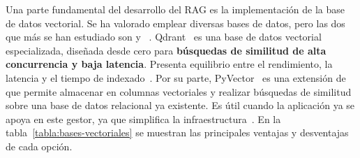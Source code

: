 Una parte fundamental del desarrollo del RAG es la implementación de la base de datos vectorial. Se ha valorado emplear diversas bases de datos, pero las dos que más se han estudiado son  y ~. Qdrant~\cite{selenium:docs} es una base de datos vectorial especializada, diseñada desde cero para \textbf{búsquedas de similitud de alta concurrencia y baja latencia}. Presenta equilibrio entre el rendimiento, la latencia y el tiempo de indexado~\cite{llmeng:handbook}. Por su parte, PyVector~\cite{playwright:actionability} es una extensión de  que permite almacenar  en columnas vectoriales y realizar búsquedas de similitud sobre una base de datos relacional ya existente. Es útil cuando la aplicación ya se apoya en este gestor, ya que simplifica la infraestructura~\cite{Qdrant:pgvector}. En la tabla~\ref{tabla:bases-vectoriales} se muestran las principales ventajas y desventajas de cada opción.

